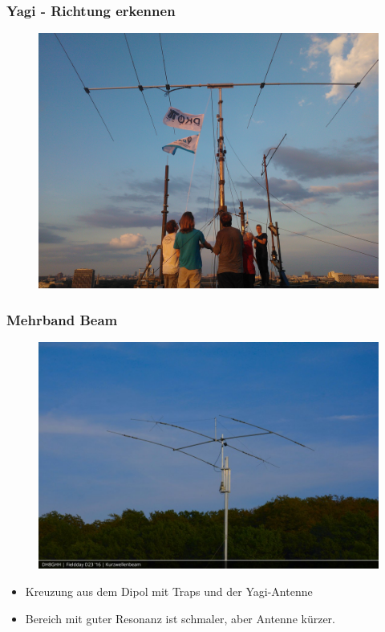 \begin{frame}
  \frametitle{Yagi - Richtung erkennen}
  \begin{center}
    \begin{figure}
      \includegraphics[width=.9\textwidth,height=.75\textheight,keepaspectratio]{a09/yagi.jpg}
    \end{figure}
  \end{center}
\end{frame}

\begin{frame}
  \frametitle{Mehrband Beam}
  \begin{center}
    \begin{figure}
      \includegraphics[width=.9\textwidth,height=.6\textheight,keepaspectratio]{a09/P160924-1657050.jpg}
    \end{figure}
    \begin{itemize}
      \item Kreuzung aus dem Dipol mit Traps und der Yagi-Antenne
      \item Bereich mit guter Resonanz ist schmaler, aber Antenne kürzer.
    \end{itemize}
  \end{center}
\end{frame}

